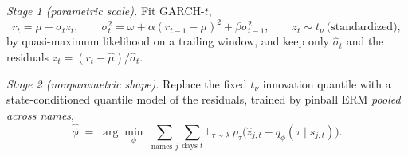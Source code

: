\documentclass[11pt]{article}
\theoremstyle{remark}
\begin{document}
\emph{Stage 1 (parametric scale).} Fit GARCH-$t$,
\begin{equation}
r_t = \mu + \sigma_t z_t,\qquad
\sigma_t^2 = \omega + \alpha (r_{t-1}-\mu)^2 + \beta \sigma_{t-1}^2,
\qquad z_t \sim t_\nu \ \text{(standardized)},
\label{eq:garch}
\end{equation}
by quasi-maximum likelihood on a trailing window, and keep only
$\widehat{\sigma}_t$ and the residuals
$\widehat{z}_t = (r_t-\widehat{\mu})/\widehat{\sigma}_t$.

\emph{Stage 2 (nonparametric shape).} Replace the fixed $t_\nu$
innovation quantile with a state-conditioned quantile model of the
residuals, trained by pinball ERM \emph{pooled across names},
\begin{equation}
\widehat{\phi} \;=\; \arg\min_{\phi}\;
\sum_{\text{names } j}\sum_{\text{days } t}
\mathbb{E}_{\tau\sim\lambda}\,
\rho_\tau\!\big(\widehat{z}_{j,t} - q_\phi(\tau \mid s_{j,t})\big).
\label{eq:shapeERM}
\end{equation}
\end{document}
